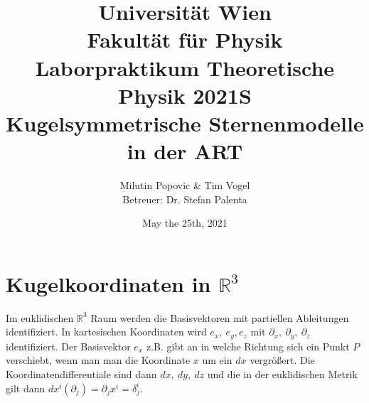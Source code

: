 \documentclass[a4paper]{article}
\title{Universität Wien\\ Fakultät für Physik\\
\vspace{1.25cm}Laborpraktikum Theoretische Physik 2021S \\ Kugelsymmetrische Sternenmodelle in der ART
}
\author{Milutin Popovic \& Tim Vogel \vspace{1cm}\\ Betreuer: Dr. Stefan
Palenta}
\date{May the 25th, 2021}
\begin{document}
\maketitle
\tableofcontents
\newpage
\section{Kugelkoordinaten in $\mathbb{R}^3$}
Im euklidischen $\mathbb{R}^3$ Raum werden die Basisvektoren mit partiellen
Ableitungen identifiziert. In kartesischen Koordinaten wird $e_x,\ e_y, e_z$
mit $\partial _x,\ \partial _y,\ \partial _z$ identifiziert. Der
Basisvektor $e_x$ z.B. gibt an in welche Richtung sich ein Punkt $P$
verschiebt, wenn man man die Koordinate $x$ um ein $dx$ vergrößert. Die
Koordinatendifferentiale sind dann $dx,\ dy,\ dz$ und die in der euklidischen
Metrik gilt dann $dx^i(\partial _j) = \partial_j x^i = \delta^i_j$.
\end{document}
